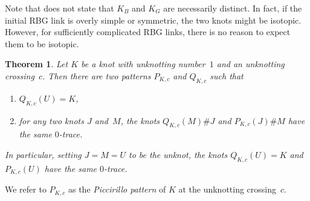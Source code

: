 \documentclass{amsart}
\newtheorem{theorem}{Theorem}%
\theoremstyle{remark}
\begin{document}
Note that  does not state that $K_B$ and $K_G$ are necessarily distinct. In fact, if the initial RBG link is overly simple or symmetric, the two knots might be isotopic. However, for sufficiently complicated RBG links, there is no reason to expect them to be isotopic.

\begin{theorem}\label{thm:satellite_knots}
    Let $K$ be a knot with unknotting number~$1$ and an 
    unknotting crossing~$c$. 
    Then there are 
    two patterns $P_{K,c}$ and $Q_{K,c}$ such that
    \begin{enumerate}[label=(\alph*)]
        \item $Q_{K,c}(U)=K$,
        \item for any two knots $J$ and~$M$, the knots 
        $Q_{K,c}(M) \#J$ and $P_{K,c}(J) \# M$ have the same $0$-trace.
    \end{enumerate}
    In particular, setting $J=M=U$ to be the unknot, the knots $Q_{K,c}(U)=K$ and~$P_{K,c}(U)$ have the same $0$-trace. 
\end{theorem}

We refer to $P_{K,c}$ as the \emph{Piccirillo pattern} of $K$ at the unknotting crossing~$c$.
\end{document}
